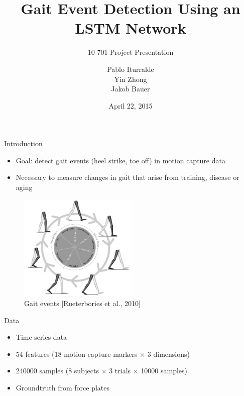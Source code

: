 \documentclass{beamer}
\title
{
    Gait Event Detection Using an LSTM Network
}
\subtitle
{
    10-701
    Project Presentation
}
\author
{
    Pablo Iturralde\\
    Yin Zhong\\
    Jakob Bauer
}
\date
{
    April 22, 2015
}
\begin{document}
\begin{frame}
  \titlepage
\end{frame}

\begin{frame}{Introduction}
    \begin{itemize}
        \item
            Goal: detect gait events (heel strike, toe off) 
            in motion capture data
        \item
            Necessary to measure changes in gait that arise from training,
            disease or aging
    \end{itemize}
    \begin{figure}
    \begin{center}
        \includegraphics[width=0.5\textwidth]{figures/gait_events.jpg}
        \caption{Gait events [Rueterbories et al., 2010]}
    \end{center}
    \end{figure}
\end{frame}

\begin{frame}{Data}
    \begin{itemize}
        \item
            Time series data
        \item
            54 features 
            (18 motion capture markers $\times$ 3 dimensions)
        \item
            \num{240000} samples 
            (8 subjects $\times$ 3 trials $\times$ \num{10000} samples)
        \item
            Groundtruth from force plates
    \end{itemize}
\end{frame}
\end{document}
